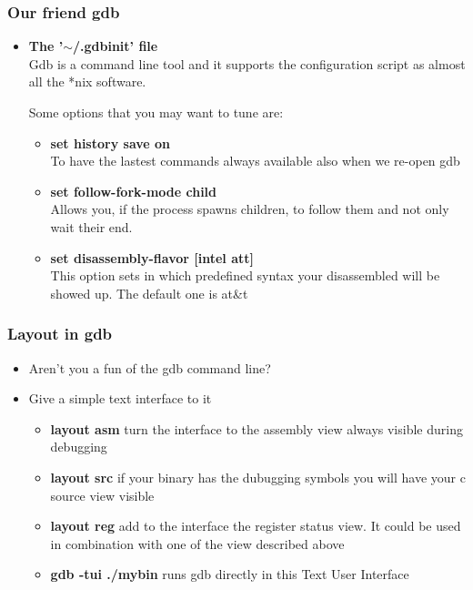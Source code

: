 \documentclass[]{beamer}
\begin{document}
      \begin{frame}
        \frametitle{Our friend gdb}
        \begin{itemize}
            \item{{\bf The '$\sim$/.gdbinit' file}}\\
            Gdb is a command line tool and it supports the configuration script as almost all the *nix software.

            Some options that you may want to tune are:
            \begin{itemize}
                \item{{\bf set history save on}}\\
                To have the lastest commands always available also when we re-open gdb
                \item{{\bf set follow-fork-mode child}}\\
                Allows you, if the process spawns children, to follow them and not only wait their end.
                \item{{\bf set disassembly-flavor [intel \textpipe{}  att]}}\\
                This option sets in which predefined syntax your disassembled will be showed up. The default one is at\&t
            \end{itemize}
        \end{itemize}
      \end{frame}

      \begin{frame}
        \frametitle{Layout in gdb}
        \begin{itemize}
            \item{Aren't you a fun of the gdb command line?}
            \item{Give a simple text interface to it}
            \begin{itemize}
                \item{{\bf layout asm} turn the interface to the assembly view always visible during debugging}
                \item{{\bf layout src} if your binary has the dubugging symbols you will have your c source view visible}
                \item{{\bf layout reg} add to the interface the register status view. It could be used in combination with one of the view described above}
                \item{{\bf gdb -tui ./mybin} runs gdb directly in this Text User Interface}
            \end{itemize}
        \end{itemize}
      \end{frame}
\end{document}
